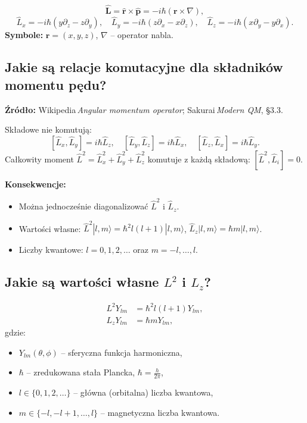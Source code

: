 		\[
		\hat{\mathbf L}=\hat{\mathbf r}\times\hat{\mathbf p}=-i\hbar(\mathbf r\times\nabla),
		\]
		\[
		\hat L_x=-i\hbar(y\partial_z-z\partial_y),\quad
		\hat L_y=-i\hbar(z\partial_x-x\partial_z),\quad
		\hat L_z=-i\hbar(x\partial_y-y\partial_x).
		\]
		\textbf{Symbole:} $\mathbf r=(x,y,z)$, $\nabla$ – operator nabla.

\subsection{Jakie są relacje komutacyjne dla składników momentu pędu?}

\textbf{Źródło:} Wikipedia\,\emph{Angular momentum operator}; Sakurai\,\emph{Modern QM}, \S3.3.
		
		Składowe nie komutują:
		\[
		[\hat L_x,\hat L_y]=i\hbar\hat L_z,\quad
		[\hat L_y,\hat L_z]=i\hbar\hat L_x,\quad
		[\hat L_z,\hat L_x]=i\hbar\hat L_y.
		\]
		Całkowity moment
		\(
		\hat L^{2}=\hat L_x^{2}+\hat L_y^{2}+\hat L_z^{2}
		\)
		komutuje z każdą składową: $[\hat L^{2},\hat L_i]=0$.
		
		\textbf{Konsekwencje:}
		\begin{itemize}
			\item Można jednocześnie diagonalizować $\hat L^{2}$ i $\hat L_z$.
			\item Wartości własne: $\hat L^{2}|l,m\rangle=\hbar^{2}l(l+1)|l,m\rangle$, $\hat L_z|l,m\rangle=\hbar m|l,m\rangle$.
			\item Liczby kwantowe: $l=0,1,2,\dots$ oraz $m=-l,\dots,l$.
		\end{itemize}

\subsection{Jakie są wartości własne $L^2$ i $L_z$?}

\begin{align*}
L^2 Y_{lm} &= \hbar^2 l(l+1) Y_{lm}, \\
L_z Y_{lm} &= \hbar m Y_{lm},
\end{align*}
gdzie:
\begin{itemize}
  \item \( Y_{lm}(\theta, \phi) \) -- sferyczna funkcja harmoniczna,
  \item \( \hbar \) -- zredukowana stała Plancka, \( \hbar = \frac{h}{2\pi} \),
  \item \( l \in \{0, 1, 2, \ldots\} \) -- główna (orbitalna) liczba kwantowa,
  \item \( m \in \{-l, -l+1, \ldots, l\} \) -- magnetyczna liczba kwantowa.
\end{itemize}

